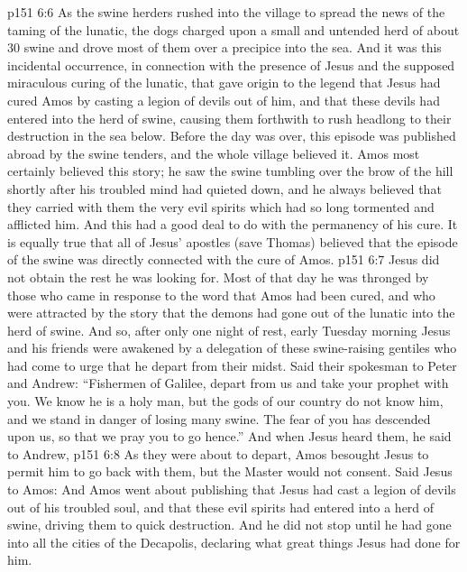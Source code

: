 \vs p151 6:6 As the swine herders rushed into the village to spread the news of the taming of the lunatic, the dogs charged upon a small and untended herd of about 30 swine and drove most of them over a precipice into the sea. And it was this incidental occurrence, in connection with the presence of Jesus and the supposed miraculous curing of the lunatic, that gave origin to the legend that Jesus had cured Amos by casting a legion of devils out of him, and that these devils had entered into the herd of swine, causing them forthwith to rush headlong to their destruction in the sea below. Before the day was over, this episode was published abroad by the swine tenders, and the whole village believed it. Amos most certainly believed this story; he saw the swine tumbling over the brow of the hill shortly after his troubled mind had quieted down, and he always believed that they carried with them the very evil spirits which had so long tormented and afflicted him. And this had a good deal to do with the permanency of his cure. It is equally true that all of Jesus’ apostles (save Thomas) believed that the episode of the swine was directly connected with the cure of Amos.
\vs p151 6:7 \pc Jesus did not obtain the rest he was looking for. Most of that day he was thronged by those who came in response to the word that Amos had been cured, and who were attracted by the story that the demons had gone out of the lunatic into the herd of swine. And so, after only one night of rest, early Tuesday morning Jesus and his friends were awakened by a delegation of these swine\hyp{}raising gentiles who had come to urge that he depart from their midst. Said their spokesman to Peter and Andrew: “Fishermen of Galilee, depart from us and take your prophet with you. We know he is a holy man, but the gods of our country do not know him, and we stand in danger of losing many swine. The fear of you has descended upon us, so that we pray you to go hence.” And when Jesus heard them, he said to Andrew, 
\vs p151 6:8 As they were about to depart, Amos besought Jesus to permit him to go back with them, but the Master would not consent. Said Jesus to Amos:  And Amos went about publishing that Jesus had cast a legion of devils out of his troubled soul, and that these evil spirits had entered into a herd of swine, driving them to quick destruction. And he did not stop until he had gone into all the cities of the Decapolis, declaring what great things Jesus had done for him.
\quizlink
